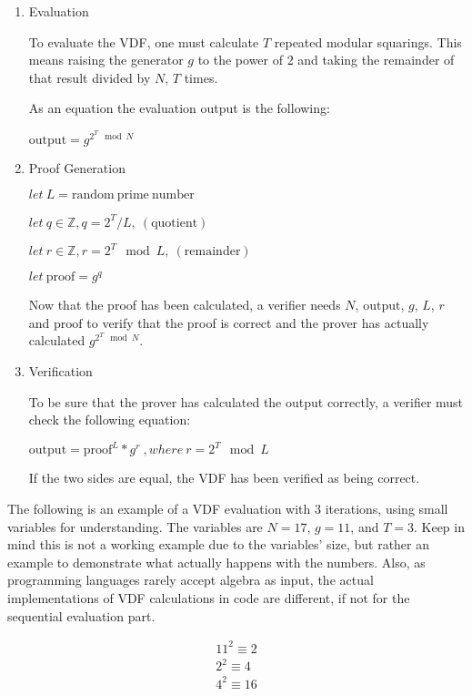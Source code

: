 \begin{enumerate}
	\item{Evaluation}

          To evaluate the VDF, one must calculate \(T\) repeated modular squarings. This means raising the generator $g$ to the power of 2 and taking the remainder of that result divided by $N$, $T$ times.

	      As an equation the evaluation output is the following:

	      \( \mathrm{output} = g^{2^{T} \mod N } \)

	\item{Proof Generation}

	      \( let \: L = \mathrm{random \: prime \: number} \)

	      \( let \: q \in \mathbb{Z}, q = 2^T/L, \: \mathrm{(quotient)} \)

	      \( let \: r \in \mathbb{Z}, r = 2^T\mod L, \: \mathrm{(remainder)} \)

	      \( let \: \mathrm{proof} = g^q \)

	      Now that the proof has been calculated, a verifier needs $N$, $\mathrm{output}$, $g$, $L$, $r$ and $\mathrm{proof}$ to verify that the proof is correct and the prover has actually calculated $g^{2^{T} \mod N }$.

	\item{Verification}

	      To be sure that the prover has calculated the output correctly, a verifier must check the following equation:

	      \( \mathrm{output} = \mathrm{proof}^L * g^r \:, where \: r = 2^T \mod L \)

	      If the two sides are equal, the VDF has been verified as being correct.
\end{enumerate}

The following is an example of a VDF evaluation with 3 iterations, using small variables for understanding. The variables are \(N=17\), \(g=11\), and \(T=3\). Keep in mind this is not a working example due to the variables' size, but rather an example to demonstrate what actually happens with the numbers. Also, as programming languages rarely accept algebra as input, the actual implementations of VDF calculations in code are different, if not for the sequential evaluation part.

\begin{align*}
	11^2 \equiv 2\\
	2^2 \equiv 4\\
	4^2 \equiv 16\\
\end{align*}

